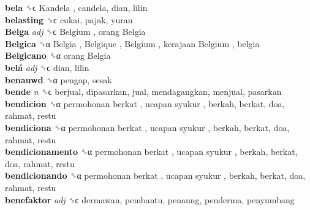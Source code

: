 \textbf{bela} ␝ϲ   Kandela , candela, dian, lilin  \\
\textbf{belasting} ␝ϲ  cukai, pajak, yuran  \\
\textbf{Belga} \emph{adj}  ␝ϲ   Belgium ,  orang Belgia   \\
\textbf{Belgica} ␝α   Belgia ,  Belgique ,  Belgium ,  kerajaan Belgium , belgia  \\
\textbf{Belgicano} ␝α   orang Belgia   \\
\textbf{belá} \emph{adj}  ␝ϲ  dian, lilin  \\
\textbf{benauwd} ␝α  pengap, sesak  \\
\textbf{bende} \emph{n}  ␝ϲ  berjual, dipasarkan, jual, mendagangkan, menjual, pasarkan  \\
\textbf{bendicion} ␝α   permohonan berkat ,  ucapan syukur , berkah, berkat, doa, rahmat, restu  \\
\textbf{bendiciona} ␝α   permohonan berkat ,  ucapan syukur , berkah, berkat, doa, rahmat, restu  \\
\textbf{bendicionamento} ␝α   permohonan berkat ,  ucapan syukur , berkah, berkat, doa, rahmat, restu  \\
\textbf{bendicionando} ␝α   permohonan berkat ,  ucapan syukur , berkah, berkat, doa, rahmat, restu  \\
\textbf{benefaktor} \emph{adj}  ␝ϲ  dermawan, pembantu, penaung, penderma, penyumbang  \\
